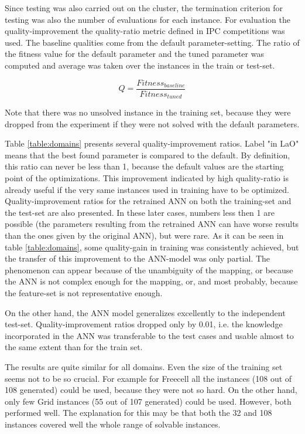 \documentclass{MYsig-alternate}
\begin{document}
Since testing was also carried out on the cluster, the termination criterion for testing was also the number of evaluations for each instance. For evaluation the quality-improvement the quality-ratio metric defined in IPC competitions was used. The baseline qualities come from the default parameter-setting. The ratio of the fitness value for the default parameter and the tuned parameter was computed and average was taken over the instances in the train or test-set. 

\begin{equation}Q=\frac{Fitness_{baseline}}{Fitness_{tuned}}\end{equation}

Note that there was no unsolved instance in the training set, because they were dropped from the experiment if they were not solved with the default parameters. 

Table \ref{table:domains} presents several quality-improvement ratios. Label "in LaO" means that the best found parameter is compared to the default. By definition, this ratio can never be less than 1, because the default values are the starting point of the optimizations. This improvement indicated by high quality-ratio is already useful if the very same instances used in training have to be optimized. Quality-improvement ratios for the retrained ANN on both the training-set and the test-set are also presented. In these later cases, numbers less then 1 are possible (the parameters resulting from the retrained ANN can have worse results than the ones given by the original ANN), but were rare. As it can be seen in table \ref{table:domains}, some quality-gain in training was consistently achieved, but the transfer of this improvement to the ANN-model was only partial. The phenomenon can appear because of the unambiguity of the mapping, or because the ANN is not complex enough for the mapping, or, and most probably, because the feature-set is not representative enough. 

On the other hand, the ANN model generalizes excellently to the independent test-set. Quality-improvement ratios dropped only by 0.01, i.e. the knowledge incorporated in the ANN was transferable to the test cases and usable almost to the same extent than for the train set.

The results are quite similar for all domains. Even the size of the training set seems not to be so crucial. For example for Freecell all the instances (108 out of 108 generated) could be used, because they were not so hard. On the other hand, only few  Grid instances (55 out of 107 generated) could be used. However, both performed well. The explanation for this may be that both the 32 and 108 instances covered well the whole range of solvable instances.
\end{document}
